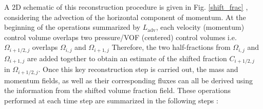 A 2D schematic of this reconstruction procedure is given in Fig. \ref{shift_frac} 
, considering the advection of the horizontal component of momentum. 
At the beginning of the operations summarized by $L_{\textrm{adv}}$, 
each velocity (momentum) control volume overlaps two pressure/VOF (centered)
control volumes i.e.  $\Omega_{i+1/2,j}$ overlaps $\Omega_{i,j}$ and $\Omega_{i+1,j}$
Therefore, the two half-fractions from $\Omega_{i,j}$ and $\Omega_{i+1,j}$ are 
added together to obtain an estimate
of the shifted fraction $C_{i+1/2,j}$ in $\Omega_{i+1/2,j}$. 
Once this key reconstruction step is carried out, the mass and momentum
fields, as well as their corresponding fluxes can all be derived using the information
from the shifted volume fraction field. These operations performed at each time step
are summarized in the following steps : 


